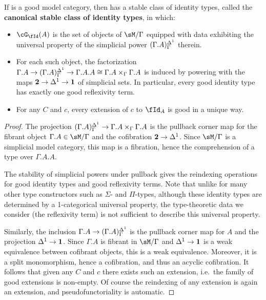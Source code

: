 \documentclass[referee]{psp}
\let\Id\fId
\let\G\cG
\begin{document}
\begin{thm}\label{thm:stable-id}
  If \sM is a good model category, then \fibm has a stable class of identity types, called the \textbf{canonical stable class of identity types}, in which:
  \begin{itemize}
  \item $\G_\Id(A)$ is the set of objects of $\sM/\Gamma$ equipped with data exhibiting the universal property of the simplicial power $(\Gamma.A)^{\Delta^1}_\Gamma$ therein.
  \item For each such object, the factorization $\Gamma.A \to (\Gamma.A)^{\Delta^1}_\Gamma \to \Gamma.A.A \cong \Gamma.A \times_\Gamma \Gamma.A$ is induced by powering with the maps $\mathbf{2} \to {\Delta^1} \to \mathbf{1}$ of simplicial sets.
    In particular, every good identity type has exactly one good reflexivity term.
  \item For any $C$ and $c$, every extension of $c$ to $\Id_A$ is good in a unique way.
  \end{itemize}
\end{thm}
\begin{proof}
  The projection $(\Gamma.A)^{\Delta^1}_\Gamma \to \Gamma.A\times_\Gamma \Gamma.A$ is the pullback corner map for the fibrant object $\Gamma.A\in\sM/\Gamma$ and the cofibration $\mathbf{2}\to {\Delta^1}$.
  Since $\sM/\Gamma$ is a simplicial model category, this map is a fibration, hence the comprehension of a type over $\Gamma.A.A$.

  The stability of simplicial powers under pullback gives the reindexing operations for good identity types and good reflexivity terms.
  Note that unlike for many other type constructors such as $\Sigma$- and $\Pi$-types, although these identity types are determined by a 1-categorical universal property, the type-theoretic data we consider (the reflexivity term) is not sufficient to describe this universal property.

  Similarly, the inclusion $\Gamma.A\to (\Gamma.A)^{\Delta^1}_\Gamma$ is the pullback corner map for $A$ and the projection ${\Delta^1} \to \mathbf{1}$.
  Since $\Gamma.A$ is fibrant in $\sM/\Gamma$ and ${\Delta^1} \to \mathbf{1}$ is a weak equivalence between cofibrant objects, this is a weak equivalence.
  Moreover, it is a split monomorphism, hence a cofibration, and thus an acyclic cofibration.
  It follows that given any $C$ and $c$ there exists such an extension, i.e.\ the family of good extensions is non-empty.
  Of course the reindexing of any extension is again an extension, and pseudofunctoriality is automatic.
\end{proof}
\end{document}
